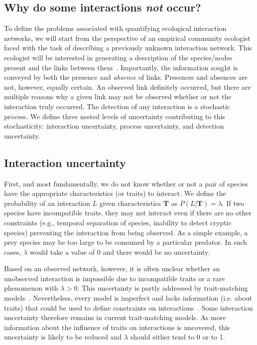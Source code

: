 \documentclass[12pt]{article}
\begin{document}
\begin{spacing}{2.0}
\section*{Why do some interactions \emph{not} occur?}

  To define the problems associated with quantifying ecological interaction networks, we will start from the perspective of an empirical community ecologist faced with the task of describing a previously unknown interaction network. This ecologist will be interested in generating a description of the species/nodes present and the links between them~\citep{Roslin2016}.  Importantly, the information sought is conveyed by both the presence and \emph{absence} of links. Presences and absences are not, however, equally certain. An observed link definitely occurred, but there are multiple reasons why a given link may not be observed whether or not the interaction truly occurred. The detection of any interaction is a stochastic process. We define three nested levels of uncertainty contributing to this stochasticity: interaction uncertainty, process uncertainty, and detection uncertainty.


    \subsection*{Interaction uncertainty} 

      First, and most fundamentally, we do not know whether or not a pair of species have the appropriate characteristics (or traits) to interact. We define the probability of an interaction $L$ given characteristics $\mathbf{T}$ as $P(L | \mathbf{T})=\lambda$. If two species have incompatible traits, they may not interact even if there are no other constraints (e.g., temporal separation of species, inability to detect cryptic species) preventing the interaction from being observed. As a simple example, a prey species may be too large to be consumed by a particular predator. In such cases, $\lambda$ would take a value of 0 and there would be no uncertainty. 

      Based on an observed network, however, it is often unclear whether an unobserved interaction is impossible due to incompatible traits or a rare phenomenon with $\lambda>0$. This uncertainty is partly addressed by trait-matching models~\citep{Bartomeus2016}. Nevertheless, every model is imperfect and lacks information (i.e. about traits) that could be used to define constraints on interactions~\citep{Dormann2017}. Some interaction uncertainty therefore remains in current trait-matching models. As more information about the influence of traits on interactions is uncovered, this uncertainty is likely to be reduced and $\lambda$ should either tend to 0 or to 1. 



\end{spacing}
\end{document}
